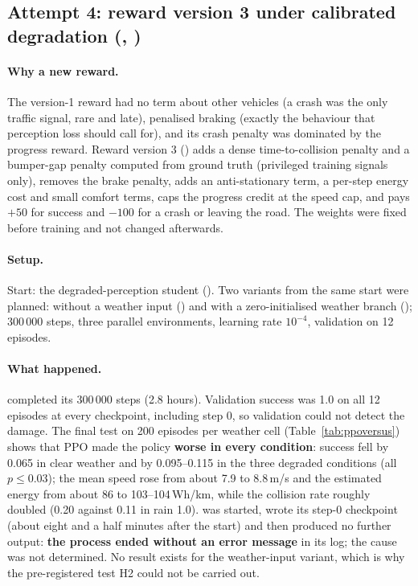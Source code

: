 \subsection{Attempt 4: reward version 3 under calibrated degradation (, )}
\paragraph{Why a new reward.} The version-1 reward had no term about other vehicles (a crash was the only traffic signal, rare and late), penalised braking (exactly the behaviour that perception loss should call for), and its crash penalty was dominated by the progress reward. Reward version 3 () adds
a dense time-to-collision penalty and a bumper-gap penalty computed from ground truth (privileged training signals only), removes the brake penalty, adds an anti-stationary term, a per-step energy cost and small comfort terms, caps the progress credit at the speed cap, and pays $+50$ for success and $-100$ for a crash or leaving the road.
The weights were fixed before training and not changed afterwards.
\paragraph{Setup.} Start: the degraded-perception student (). Two variants from the same start were planned: without a weather input () and with a zero-initialised weather branch (); 300\,000 steps, three parallel environments, learning rate $10^{-4}$, validation on 12 episodes.
\paragraph{What happened.}  completed its 300\,000 steps (2.8 hours). Validation success was 1.0 on all 12 episodes at every checkpoint, including step 0, so validation could not detect the damage. The final test on 200 episodes per weather cell (Table~\ref{tab:ppoversus}) shows that PPO made the policy \textbf{worse in every condition}: success fell by 0.065 in clear weather and by 0.095--0.115 in the three degraded conditions (all $p\le0.03$);
the mean speed rose from about 7.9 to 8.8\,m/s and the estimated energy from about 86 to 103--104\,Wh/km, while the collision rate roughly doubled (0.20 against 0.11 in rain 1.0).
 was started, wrote its step-0 checkpoint (about eight and a half minutes after the start) and then produced no further output: \textbf{the process ended without an error message} in its log; the cause was not determined. No result exists for the weather-input variant, which is why the pre-registered test H2 could not be carried out.
\begin{table}[H]\centering\small
\caption{Reward-version-3 PPO against its own starting point, calibrated perception, 200 paired episodes per weather condition.}\label{tab:ppoversus}
\resizebox{\textwidth}{!}{}
\end{table}
